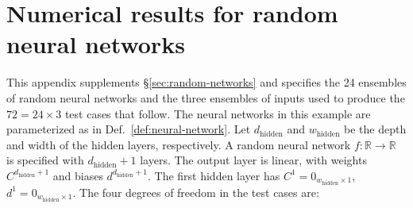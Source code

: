 \documentclass{article}
\begin{document}
\clearpage
\section{Numerical results for random neural networks}
\label{app:random-neural-networks}
This appendix supplements \S\ref{sec:random-networks} and specifies the 24 ensembles of random neural networks and the three ensembles of inputs used to produce the \(72 = 24 \times 3\) test cases that follow.
The neural networks in this example are parameterized as in Def.~\ref{def:neural-network}.
Let \(d_\mathrm{hidden}\) and \(w_\mathrm{hidden}\) be the depth and width of the hidden layers, respectively.
A random neural network \(f:\mathbb{R} \to \mathbb{R}\) is specified with \(d_\mathrm{hidden} + 1\) layers.
The output layer is linear, with weights \(C^{d_\mathrm{hidden}+1}\) and biases \(d^{d_\mathrm{hidden}+1}\).
The first hidden layer has \(C^1 = 0_{w_\mathrm{hidden} \times 1}\), \(d^1 = 0_{w_\mathrm{hidden} \times 1}\).
The four degrees of freedom in the test cases are:
\end{document}
